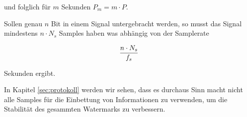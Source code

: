 und folglich für $m$ Sekunden ${P}_{m} = m \cdot P$. 

Sollen genau $n$ Bit in einem Signal untergebracht werden, so musst das Signal mindestens $n \cdot {N}_{s}$ Samples haben was abhängig von der Samplerate

	 \begin{equation}
		 { n \cdot {N}_{s} \over {f}_{s} }
	 	\label{equ:bitcapacity_seconds}
	 \end{equation}
	 
Sekunden ergibt. 

In Kapitel \ref{sec:protokoll} werden wir sehen, dass es durchaus Sinn macht nicht alle Samples für die Einbettung von Informationen zu verwenden, um die Stabilität des gesammten Watermarks zu verbessern. 






